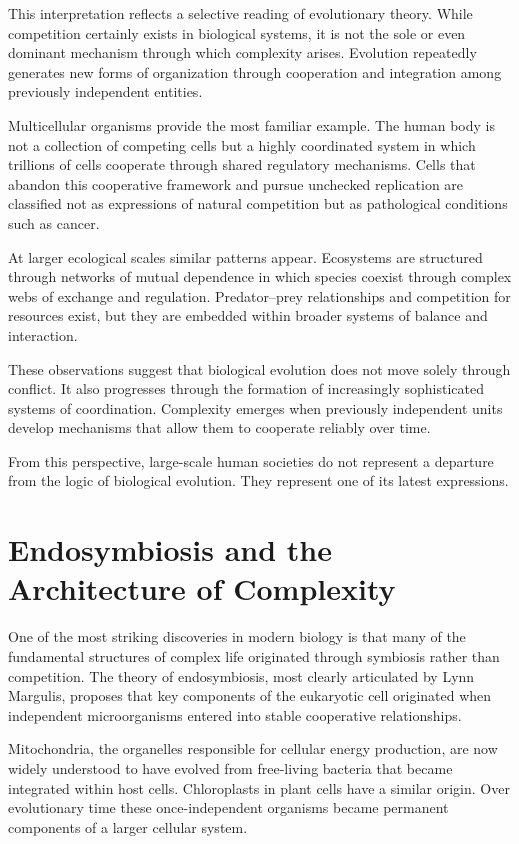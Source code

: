 \documentclass[12pt]{article}
\begin{document}
This interpretation reflects a selective reading of evolutionary theory. While competition certainly exists in biological systems, it is not the sole or even dominant mechanism through which complexity arises. Evolution repeatedly generates new forms of organization through cooperation and integration among previously independent entities.

Multicellular organisms provide the most familiar example. The human body is not a collection of competing cells but a highly coordinated system in which trillions of cells cooperate through shared regulatory mechanisms. Cells that abandon this cooperative framework and pursue unchecked replication are classified not as expressions of natural competition but as pathological conditions such as cancer.

At larger ecological scales similar patterns appear. Ecosystems are structured through networks of mutual dependence in which species coexist through complex webs of exchange and regulation. Predator--prey relationships and competition for resources exist, but they are embedded within broader systems of balance and interaction.

These observations suggest that biological evolution does not move solely through conflict. It also progresses through the formation of increasingly sophisticated systems of coordination. Complexity emerges when previously independent units develop mechanisms that allow them to cooperate reliably over time.

From this perspective, large-scale human societies do not represent a departure from the logic of biological evolution. They represent one of its latest expressions.

\section{Endosymbiosis and the Architecture of Complexity}

One of the most striking discoveries in modern biology is that many of the fundamental structures of complex life originated through symbiosis rather than competition. The theory of endosymbiosis, most clearly articulated by Lynn Margulis, proposes that key components of the eukaryotic cell originated when independent microorganisms entered into stable cooperative relationships.

Mitochondria, the organelles responsible for cellular energy production, are now widely understood to have evolved from free-living bacteria that became integrated within host cells. Chloroplasts in plant cells have a similar origin. Over evolutionary time these once-independent organisms became permanent components of a larger cellular system.
\end{document}
